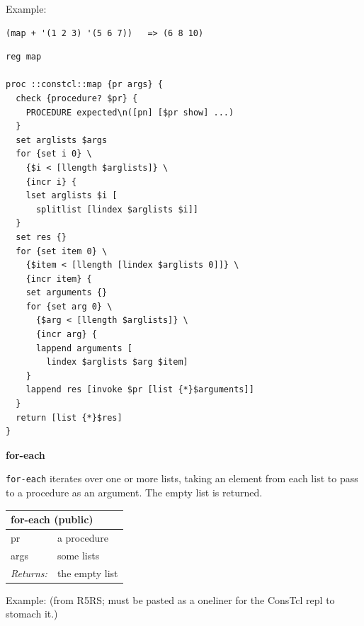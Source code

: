 \documentclass[twoside,9pt]{report}
\begin{document}
Example:

\noindent\makebox[\linewidth]{\rule{\linewidth}{0.4pt}}
\begin{lstlisting}
(map + '(1 2 3) '(5 6 7))   => (6 8 10)
\end{lstlisting}
\noindent\makebox[\linewidth]{\rule{\linewidth}{0.4pt}}
\noindent\makebox[\linewidth]{\rule{\linewidth}{0.4pt}}
\begin{lstlisting}
reg map
 
proc ::constcl::map {pr args} {
  check {procedure? $pr} {
    PROCEDURE expected\n([pn] [$pr show] ...)
  }
  set arglists $args
  for {set i 0} \
    {$i < [llength $arglists]} \
    {incr i} {
    lset arglists $i [
      splitlist [lindex $arglists $i]]
  }
  set res {}
  for {set item 0} \
    {$item < [llength [lindex $arglists 0]]} \
    {incr item} {
    set arguments {}
    for {set arg 0} \
      {$arg < [llength $arglists]} \
      {incr arg} {
      lappend arguments [
        lindex $arglists $arg $item]
    }
    lappend res [invoke $pr [list {*}$arguments]]
  }
  return [list {*}$res]
}
\end{lstlisting}
\noindent\makebox[\linewidth]{\rule{\linewidth}{0.4pt}}

\textbf{for-each}


\texttt{for-each} iterates over one or more lists, taking an element from each list to pass to a procedure as an argument. The empty list is returned.

\begin{tabular}{ |l l| }
\hline
\multicolumn{2}{|l|}{for-each (public)} \\
\hline
pr & a procedure \\
args & some lists \\
\textit{Returns:} & the empty list \\
\hline
\end{tabular}


Example: (from R5RS; must be pasted as a oneliner for the ConsTcl repl to stomach it.)
\end{document}
